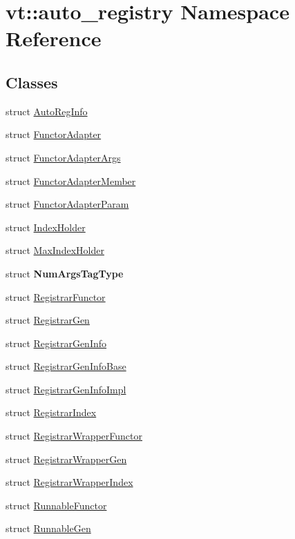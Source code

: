 \hypertarget{namespacevt_1_1auto__registry}{}\section{vt\+:\+:auto\+\_\+registry Namespace Reference}
\label{namespacevt_1_1auto__registry}
\subsection*{Classes}
\begin{DoxyCompactItemize}
\item 
struct \hyperlink{structvt_1_1auto__registry_1_1_auto_reg_info}{Auto\+Reg\+Info}
\item 
struct \hyperlink{structvt_1_1auto__registry_1_1_functor_adapter}{Functor\+Adapter}
\item 
struct \hyperlink{structvt_1_1auto__registry_1_1_functor_adapter_args}{Functor\+Adapter\+Args}
\item 
struct \hyperlink{structvt_1_1auto__registry_1_1_functor_adapter_member}{Functor\+Adapter\+Member}
\item 
struct \hyperlink{structvt_1_1auto__registry_1_1_functor_adapter_param}{Functor\+Adapter\+Param}
\item 
struct \hyperlink{structvt_1_1auto__registry_1_1_index_holder}{Index\+Holder}
\item 
struct \hyperlink{structvt_1_1auto__registry_1_1_max_index_holder}{Max\+Index\+Holder}
\item 
struct {\bfseries Num\+Args\+Tag\+Type}
\item 
struct \hyperlink{structvt_1_1auto__registry_1_1_registrar_functor}{Registrar\+Functor}
\item 
struct \hyperlink{structvt_1_1auto__registry_1_1_registrar_gen}{Registrar\+Gen}
\item 
struct \hyperlink{structvt_1_1auto__registry_1_1_registrar_gen_info}{Registrar\+Gen\+Info}
\item 
struct \hyperlink{structvt_1_1auto__registry_1_1_registrar_gen_info_base}{Registrar\+Gen\+Info\+Base}
\item 
struct \hyperlink{structvt_1_1auto__registry_1_1_registrar_gen_info_impl}{Registrar\+Gen\+Info\+Impl}
\item 
struct \hyperlink{structvt_1_1auto__registry_1_1_registrar_index}{Registrar\+Index}
\item 
struct \hyperlink{structvt_1_1auto__registry_1_1_registrar_wrapper_functor}{Registrar\+Wrapper\+Functor}
\item 
struct \hyperlink{structvt_1_1auto__registry_1_1_registrar_wrapper_gen}{Registrar\+Wrapper\+Gen}
\item 
struct \hyperlink{structvt_1_1auto__registry_1_1_registrar_wrapper_index}{Registrar\+Wrapper\+Index}
\item 
struct \hyperlink{structvt_1_1auto__registry_1_1_runnable_functor}{Runnable\+Functor}
\item 
struct \hyperlink{structvt_1_1auto__registry_1_1_runnable_gen}{Runnable\+Gen}
\end{DoxyCompactItemize}
